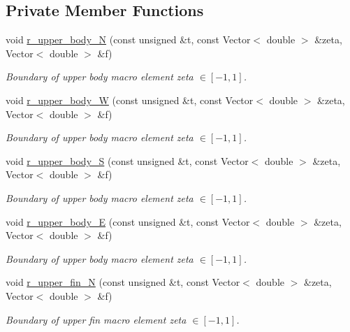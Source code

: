 \subsection*{Private Member Functions}
\begin{DoxyCompactItemize}
\item 
void \hyperlink{classoomph_1_1FishDomain_a45f1d71d2cf6f4102486b04362ba8b0b}{r\+\_\+upper\+\_\+body\+\_\+N} (const unsigned \&t, const Vector$<$ double $>$ \&zeta, Vector$<$ double $>$ \&f)
\begin{DoxyCompactList}\small\item\em Boundary of upper body macro element zeta $ \in [-1,1] $. \end{DoxyCompactList}\item 
void \hyperlink{classoomph_1_1FishDomain_ac0fadb2212e194bfe9f2ff7f0c892c22}{r\+\_\+upper\+\_\+body\+\_\+W} (const unsigned \&t, const Vector$<$ double $>$ \&zeta, Vector$<$ double $>$ \&f)
\begin{DoxyCompactList}\small\item\em Boundary of upper body macro element zeta $ \in [-1,1] $. \end{DoxyCompactList}\item 
void \hyperlink{classoomph_1_1FishDomain_af30cc8b5bc73f1d2e71099c19b2a0d98}{r\+\_\+upper\+\_\+body\+\_\+S} (const unsigned \&t, const Vector$<$ double $>$ \&zeta, Vector$<$ double $>$ \&f)
\begin{DoxyCompactList}\small\item\em Boundary of upper body macro element zeta $ \in [-1,1] $. \end{DoxyCompactList}\item 
void \hyperlink{classoomph_1_1FishDomain_a47bdf57eebfa025628e70da2a1ab9e19}{r\+\_\+upper\+\_\+body\+\_\+E} (const unsigned \&t, const Vector$<$ double $>$ \&zeta, Vector$<$ double $>$ \&f)
\begin{DoxyCompactList}\small\item\em Boundary of upper body macro element zeta $ \in [-1,1] $. \end{DoxyCompactList}\item 
void \hyperlink{classoomph_1_1FishDomain_a6b0cc31071869ef0e4b4794fe5a46d2f}{r\+\_\+upper\+\_\+fin\+\_\+N} (const unsigned \&t, const Vector$<$ double $>$ \&zeta, Vector$<$ double $>$ \&f)
\begin{DoxyCompactList}\small\item\em Boundary of upper fin macro element zeta $ \in [-1,1] $. \end{DoxyCompactList}\item 

\end{DoxyCompactItemize}

